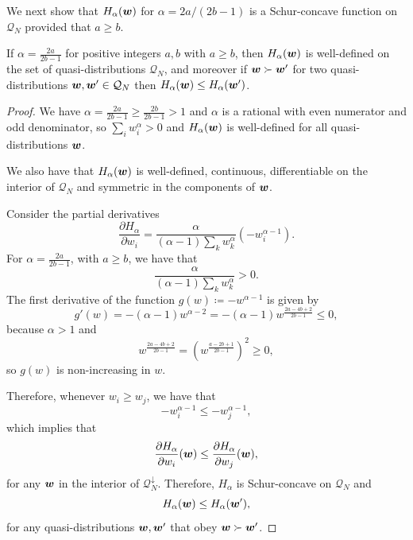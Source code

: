 \documentclass[pra,
aps,
twocolumn,
superscriptaddress,
groupedaddress,
nofootinbib,
reprint
]{revtex4-1}
\begin{document}
We next show that $H_\alpha (\boldsymbol{w})$ for $\alpha = 2a/(2b-1)$ is a Schur-concave function on $\mathcal{Q}_N$ provided that $a \ge b$.


\begingroup
\def\thetheorem{\ref{thm:HSchur}}
\begin{theorem}
	If $\alpha = \frac{2a}{2b-1}$ for positive integers $a,b$ with $a \geq b$, then $H_\alpha(\boldsymbol{w})$ is well-defined on the set of quasi-distributions $\mathcal{Q}_N$, and moreover if $\boldsymbol{w} \succ \boldsymbol{w}'$ for two quasi-distributions $\boldsymbol{w}, \boldsymbol{w}'\in \mathcal{Q}_N$ then $H_\alpha (\boldsymbol{w}) \leq H_\alpha(\boldsymbol{w}')$.
\end{theorem}
\addtocounter{theorem}{-1}
\endgroup
\begin{proof}
We have $\alpha = \frac{2a}{2b-1} \geq \frac{2b}{2b-1} > 1$ and $\alpha$ is a rational with even numerator and odd denominator, so $\sum_i w_i^\alpha > 0$ and $H_\alpha(\boldsymbol{w})$ is well-defined for all quasi-distributions $\boldsymbol{w}$.

We also have that $H_\alpha(\boldsymbol{w})$ is well-defined, continuous, differentiable on the interior of $\mathcal{Q}_N$ and symmetric in the components of $\boldsymbol{w}$.

Consider the partial derivatives
\begin{equation}
	\frac{\partial H_\alpha}{\partial w_i} = \frac{\alpha}{(\alpha-1)\sum_k{w_k^\alpha}}\left( -w_i^{\alpha-1} \right).
\end{equation}
For $\alpha= \frac{2a}{2b-1}$,  with $a\ge b$, we have that
\begin{equation}
	\frac{\alpha}{(\alpha-1)\sum_k{w_k^\alpha}} > 0.
\end{equation}
The first derivative of the function $g(w) \coloneqq -w^{\alpha - 1}$ is given by
\begin{equation}
	g'(w) = -(\alpha - 1) w^{\alpha-2} = -(\alpha - 1)w^{\frac{2a-4b+2}{2b-1}} \leq 0,
\end{equation}
because $\alpha > 1$ and
\begin{equation}
	w^{\frac{2a-4b+2}{2b-1}} = \left(w^{\frac{a-2b+1}{2b-1}}\right)^{2} \geq 0,
\end{equation}
so $g(w)$ is non-increasing in $w$.

Therefore, whenever $w_i \geq w_j$, we have that 
\begin{equation}
	-w_i^{\alpha-1} \leq -w_j^{\alpha-1},
\end{equation}
which implies that
\begin{equation}
	\frac{\partial H_\alpha}{\partial w_i}(\boldsymbol{w}) \leq \frac{\partial H_\alpha}{\partial w_j}(\boldsymbol{w}),
\end{equation}
for any $\boldsymbol{w}$ in the interior of $\mathcal{Q}_N^\downarrow$.
Therefore, $H_\alpha$ is Schur-concave on $\mathcal{Q}_N$ and
\begin{equation}
	H_\alpha(\boldsymbol{w}) \leq H_\alpha(\boldsymbol{w}'),
\end{equation}
for any quasi-distributions $\boldsymbol{w}, \boldsymbol{w}'$ that obey $\boldsymbol{w} \succ \boldsymbol{w}'$.
\end{proof}
\end{document}
